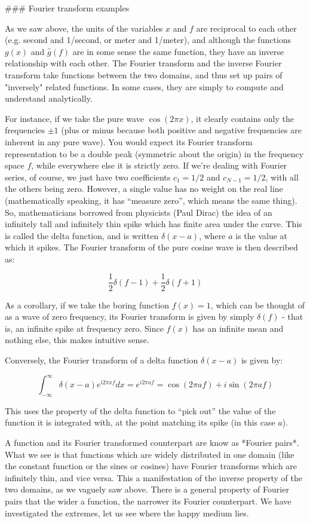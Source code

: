 ### Fourier transform examples

As we saw above, the units of the variables $x$ and $f$ are reciprocal to each other (e.g. second and 1/second, or meter and 1/meter), and although the functions $g(x)$ and $\widehat g(f)$ are in some sense the same function, they have an inverse relationship with each other. The Fourier transform and the inverse Fourier transform take functions between the two domains, and thus set up pairs of "inversely" related functions. In some cases, they are simply to compute and understand analytically. 

For instance, if we take the pure wave $\cos(2\pi x)$, it clearly contains only the frequencies $\pm 1$ (plus or minus because both positive and negative frequencies are inherent in any pure wave). You would expect its Fourier transform representation to be a double peak (symmetric about the origin) in the frequency space $f$, while everywhere else it is strictly zero. If we're dealing with Fourier series, of course, we just have two coefficients $c_1=1/2$ and $c_{N-1} = 1/2$, with all the others being zero. However, a single value has no weight on the real line (mathematically speaking, it has ``measure zero'', which means the same thing). So, mathematicians borrowed from physicists (Paul Dirac) the idea of an infinitely tall and infinitely thin spike which has finite area under the curve. This is called the delta function, and is written $\delta(x-a)$, where $a$ is the value at which it spikes. The Fourier transform of the pure cosine wave is then described as: 

$$ \frac{1}{2}\delta(f-1) + \frac{1}{2} \delta(f+1)$$

As a corollary, if we take the boring function $f(x)=1$, which can be thought of as a wave of zero frequency, its Fourier transform is given by simply $\delta(f)$ - that is, an infinite spike at frequency zero. Since $f(x)$ has an infinite mean and nothing else, this makes intuitive sense.

Conversely, the Fourier transform of a delta function $\delta(x-a)$ is given by:

$$ 
\int_{-\infty} ^\infty \delta(x-a) e^{i2\pi xf} dx = e^{i2\pi af} = \cos(2\pi af ) + i\sin(2\pi af)
$$

This uses the property of the delta function to ``pick out'' the value of the function it is integrated with, at the point matching its spike (in this case $a$). 

A function and its Fourier transformed counterpart are know as *Fourier pairs*. What we see is that functions which are widely distributed in one domain (like the constant function or the sines or cosines) have Fourier transforms which are infinitely thin, and vice versa. This a manifestation of the inverse property of the two domains, as we vaguely saw above. There is a general property of Fourier pairs that the wider a function, the narrower its Fourier counterpart. We have investigated the extremes, let us see where the happy medium lies. 

